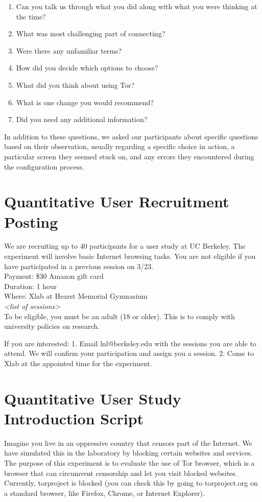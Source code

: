\documentclass{template}
\begin{document}
\begin{enumerate} \itemsep1pt \parskip0pt  
\item{Can you talk us through what you did along with what you were thinking at the time?}
\item{What was most challenging part of connecting?}
\item{Were there any unfamiliar terms?}
\item{How did you decide which options to choose?}
\item{What did you think about using Tor?}
\item{What is one change you would recommend?} 
\item{Did you need any additional information?} 
\end{enumerate}  

In addition to these questions, we asked our participants about specific questions based on their observation, usually regarding a specific choice in action, a particular screen they seemed stuck on, and any errors they encountered during the configuration process. 

\section{Quantitative User Recruitment Posting}
We are recruiting up to 40 participants for a user study at UC Berkeley. The experiment will involve basic Internet browsing tasks. You are not eligible if you have participated in a previous session on 3/23.\\

\indent Payment: \$30 Amazon gift card\\
\indent Duration: 1 hour \\
\indent Where: Xlab at Hearst Memorial Gymnasium\\

\textit{<list of sessions>}\\

To be eligible, you must be an adult (18 or older). This is to comply with university policies on research. 

If you are interested: 1. Email lnl@berkeley.edu with the sessions you are able to attend. We will confirm your participation and assign you a session. 2. Come to Xlab at the appointed time for the experiment.

\section{Quantitative User Study Introduction Script} 
Imagine you live in an oppressive country that censors part of the Internet. We have simulated this in the laboratory by blocking certain websites and services.  The purpose of this experiment is to evaluate the use of Tor browser, which is a browser that can circumvent censorship and let you visit blocked websites. Currently, torproject is blocked (you can check this by going to torproject.org on a standard browser, like Firefox, Chrome, or Internet Explorer). 
\end{document}
